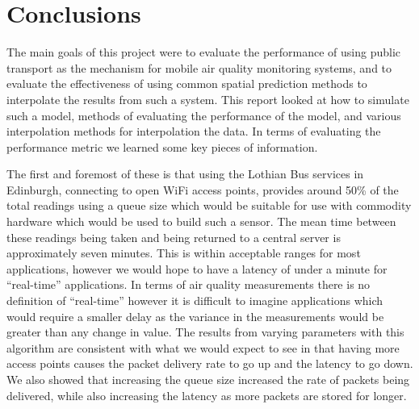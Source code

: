 \chapter{Conclusions}\label{conclusions}


The main goals of this project were to evaluate the performance of using public transport as the mechanism for mobile air quality monitoring systems, and to evaluate the effectiveness of using common spatial prediction methods to interpolate the results from such a system. This report looked at how to simulate such a model, methods of evaluating the performance of the model, and various interpolation methods for interpolation the data. In terms of evaluating the performance metric we learned some key pieces of information. 

The first and foremost of these is that using the Lothian Bus services in Edinburgh, connecting to open WiFi access points, provides around 50\% of the total readings using a queue size which would be suitable for use with commodity hardware which would be used to build such a sensor. The mean time between these readings being taken and being returned to a central server is approximately seven minutes. This is within acceptable ranges for most applications, however we would hope to have a latency of under a minute for ``real-time'' applications. In terms of air quality measurements there is no definition of ``real-time'' however it is difficult to imagine applications which would require a smaller delay as the variance in the measurements would be greater than any change in value. The results from varying parameters with this algorithm are consistent with what we would expect to see in that having more access points causes the packet delivery rate to go up and the latency to go down. We also showed that increasing the queue size increased the rate of packets being delivered, while also increasing the latency as more packets are stored for longer. 

